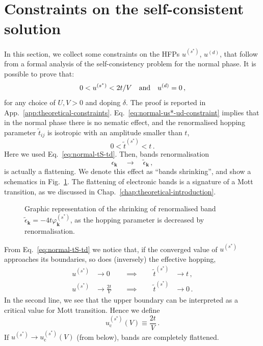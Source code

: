 \section{Constraints on the self-consistent solution} \label{sec:normal-sceq-analysis}

In this section, we collect some constraints on the HFPs $u^{(s^*)}$, $u^{(d)}$, that follow from a formal analysis of the self-consistency problem for the normal phase. It is possible to prove that:
\begin{equation}\label{eq:normal-us*-ud-constraint}
	0 < u^{(s^*)} < 2t/V
	\qq{and}
	u^{(d)} = 0 \, ,
\end{equation}
for any choice of $U,V>0$ and doping $\delta$. The proof is reported in App.~\ref{app:theoretical-constraints}. Eq.~\eqref{eq:normal-us*-ud-constraint} implies that in the normal phase there is no nematic effect, and the renormalised hopping parameter $\tilde{t}_{ij}$ is isotropic with an amplitude smaller than $t$,
\[
	0 < \tilde{t}^{(s^*)} < t \, .
\]
Here we used Eq.~\eqref{eq:normal-tS-td}. Then, bands renormalisation
\[
	\epsilon_\mathbf{k}
	\quad\to\quad
	\tilde{\epsilon}_\mathbf{k} \, ,
\]
is actually a flattening. We denote this effect as ``bands shrinking'', and show a schematics in Fig.~\ref{fig:bands-shrinking}. The flattening of electronic bands is a signature of a Mott transition, as we discussed in Chap.~\ref{chap:theoretical-introduction}.

\begin{figure}
	\centering
	
	\caption{Graphic representation of the shrinking of renormalised band $\tilde{\epsilon}_\mathbf{k} = -4t \varphi_\mathbf{k}^{(s^*)}$, as the hopping parameter is decreased by renormalisation.}
	\label{fig:bands-shrinking}
\end{figure}

From Eq.~\eqref{eq:normal-tS-td} we notice that, if the converged value of $u^{(s^*)}$ approaches its boundaries, so does (inversely) the effective hopping,
\[
\begin{aligned}
	u^{(s^*)} &\to 0
	&\quad\implies\qquad \tilde{t}^{(s^*)} &\to t \, , \\
	u^{(s^*)} &\to \frac{2t}{V}
	&\quad\implies\qquad \tilde{t}^{(s^*)} &\to 0 \, .
\end{aligned}
\]
In the second line, we see that the upper boundary can be interpreted as a critical value for Mott transition. Hence we define
\begin{equation}\label{eq:normal-uS-upper}
	u^{(s^*)}_\mathrm{c}(V) \equiv \frac{2t}{V} \, .
\end{equation}
If $u^{(s^*)} \to u^{(s^*)}_\mathrm{c}(V)$ (from below), bands are completely flattened.

